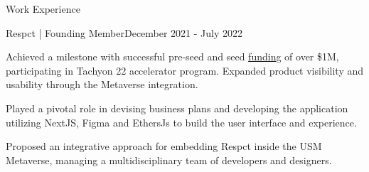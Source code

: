 \documentclass[10pt]{resume}
\begin{document}
\begin{rSection}{Work Experience}
    
    	\begin{rSubsection}{Respct | Founding Member}{December 2021 - July 2022}
                \item Achieved a milestone with successful pre-seed and seed \href{https://inc42.com/buzz/meet-the-31-web3-startups-that-are-part-of-first-cohort-of-polygonleap-2021/}{funding} of over \$1M, participating in Tachyon 22 accelerator program. Expanded product visibility and usability through the Metaverse integration.
                \item Played a pivotal role in devising business plans and developing the application utilizing NextJS, Figma and EthersJs to build the user interface and experience.  
                \item Proposed an integrative approach for embedding Respct inside the USM Metaverse, managing a multidisciplinary team of developers and designers. 
    	\end{rSubsection}
    
    \end{rSection}
    
\end{document}
